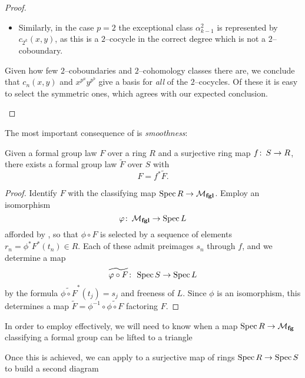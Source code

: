 \begin{proof}
\begin{description}
\begin{itemize}
\item Similarly, in the case \(p = 2\) the exceptional class \(\alpha_{k-1}^2\) is represented by \(c_{2^k}(x, y)\), as this is a \(2\)--cocycle in the correct degree which is not a \(2\)--coboundary.
\end{itemize}
Given how few \(2\)--coboundaries and \(2\)--cohomology classes there are, we conclude that \(c_n(x, y)\) and \(x^{p^a} y^{p^b}\) give a basis for \emph{all} of the \(2\)--cocycles.  Of these it is easy to select the symmetric ones, which agrees with our expected conclusion. \qedhere
\end{description}
\end{proof}

The most important consequence of  is \emph{smoothness}:
\begin{corollary}\label{MfglIsSmooth}
Given a formal group law \(F\) over a ring \(R\) and a surjective ring map \(f\colon\thinspace S \to R\), there exists a formal group law \(\widetilde F\) over \(S\) with \[F = f^* \widetilde F.\]
\end{corollary}
\begin{proof}
Identify \(F\) with the classifying map \(\operatorname{Spec} R \to \mathcal{M}_{\mathbf{fgl}}\).  Employ an isomorphism \[\varphi\colon\thinspace \mathcal{M}_{\mathbf{fgl}} \to \operatorname{Spec} L\] afforded by , so that \(\phi \circ F\) is selected by a sequence of elements \(r_n = \phi^* F^*(t_n) \in R\).  Each of these admit preimages \(s_n\) through \(f\), and we determine a map \[\widetilde{\varphi \circ F}\colon\thinspace \operatorname{Spec} S \to \operatorname{Spec} L\] by the formula \(\widetilde{\phi \circ F}^* (t_j) = s_j\) and freeness of \(L\).  Since \(\phi\) is an isomorphism, this determines a map \(\widetilde F = \phi^{-1} \circ \widetilde{\phi \circ F}\) factoring \(F\).
\end{proof}

In order to employ  effectively, we will need to know when a map \(\operatorname{Spec} R \to \mathcal{M}_{\mathbf{fg}}\) classifying a formal group can be lifted to a triangle
\begin{center}
\end{center}
Once this is achieved, we can apply  to a surjective map of rings \(\operatorname{Spec} R \to \operatorname{Spec} S\) to build a second diagram
\begin{center}
\end{center}

